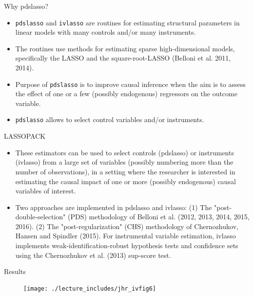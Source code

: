 \documentclass{beamer}
\begin{document}
\begin{frame}{Why pdslasso?}

\begin{itemize}
\item \texttt{pdslasso} and \texttt{ivlasso} are routines for estimating structural parameters in linear models with many controls and/or many instruments. 
\item The routines use methods for estimating sparse high-dimensional models, specifically the LASSO and the square-root-LASSO (Belloni et al. 2011, 2014).
\item Purpose of \texttt{pdslasso}  is to improve causal inference when the aim is to assess the effect of one or a few (possibly endogenous) regressors on the outcome variable. 
\item \texttt{pdslasso}  allows to select control variables and/or instruments.
\end{itemize}

\end{frame}

\begin{frame}{LASSOPACK}


\begin{itemize}
\item These estimators can be used to select controls (pdslasso) or instruments
(ivlasso) from a large set of variables (possibly numbering more than the
number of observations), in a setting where the researcher is interested in
estimating the causal impact of one or more (possibly endogenous) causal
variables of interest.
\item Two approaches are implemented in pdslasso and ivlasso: (1) The "post-
double-selection" (PDS) methodology of Belloni et al. (2012, 2013, 2014,
2015, 2016). (2) The "post-regularization" (CHS) methodology of
Chernozhukov, Hansen and Spindler (2015). For instrumental variable
estimation, ivlasso implements weak-identification-robust hypothesis tests
and confidence sets using the Chernozhukov et al. (2013) sup-score test.
\end{itemize}

\end{frame}






\begin{frame}{Results}
	\begin{figure}
             \centering
             \texttt{[image: ./lecture\_includes/jhr\_ivfig6]}
	\end{figure}
\end{frame}
\end{document}
